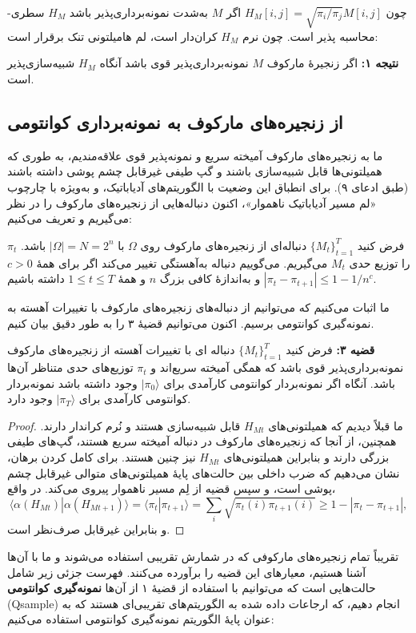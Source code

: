  چون $H_M[i,j] = \sqrt{\pi_i/\pi_j} M[i,j]$ اگر $M$ به‌شدت نمونه‌برداری‌پذیر باشد $H_M$ سطری-‌محاسبه پذیر است. چون نرم $H_M$  کران‌دار است، لم هامیلتونی تنک برقرار است: 
 
 \textbf{نتیجه ۱:}
  اگر زنجیرهٔ مارکوف $M$ نمونه‌برداری‌پذیر قوی باشد آنگاه $H_M$ شبیه‌سازی‌پذیر است.

\subsection{ از زنجیره‌های مارکوف به نمونه‌برداری کوانتومی}
ما به زنجیره‌های مارکوف آمیخته سریع و نمونه‌پذیر قوی علاقه‌مندیم، به طوری که همیلتونی‌ها قابل شبیه‌سازی باشند و گپ طیفی غیرقابل چشم پوشی داشته باشند (طبق ادعای ۹).  برای انطباق این وضعیت با الگوریتم‌های آدیاباتیک، و به‌ویژه با چارچوب «لم مسیر آدیاباتیک ناهموار»، اکنون دنباله‌هایی از زنجیره‌های مارکوف را در نظر می‌گیریم و تعریف می‌کنیم: 
\begin{defn}
	 فرض کنید $\{M_t\}_{t=1}^T$ دنباله‌ای از زنجیره‌های مارکوف روی $\Omega$ با $|\Omega| = N = 2^n$ باشد. $\pi_t$ را توزیع حدی $M_t$ می‌گیریم. می‌گوییم دنباله به‌آهستگی تغییر می‌کند اگر برای همهٔ $c > 0$ و به‌اندازهٔ کافی بزرگ $n$ و همهٔ $1 \le t \le T$ داشته باشیم $|\pi_t - \pi_{t+1}| \le 1 - 1/n^c$.
\end{defn}
ما اثبات می‌کنیم که می‌توانیم از دنباله‌های زنجیره‌های مارکوف با تغییرات آهسته به نمونه‌گیری کوانتومی برسیم. اکنون می‌توانیم قضیهٔ ۳ را به طور دقیق بیان کنیم.

\textbf{قضیه ۳:}
 فرض کنید $\{M_t\}_{t=1}^T$ دنباله ای با تغییرات آهسته از زنجیره‌های مارکوف نمونه‌برداری‌پذیر قوی باشد که همگی آمیخته سریع‌اند و $\pi_t$ توزیع‌های حدی متناظر آن‌ها باشد. آنگاه اگر نمونه‌بردار کوانتومی کارآمدی برای $|\pi_0\rangle$ وجود داشته باشد نمونه‌بردار کوانتومی کارآمدی برای $|\pi_T\rangle$ وجود دارد. 
\begin{proof}
ما قبلاً دیدیم که همیلتونی‌های $H_{Mt}$ قابل شبیه‌سازی هستند و نُرم کراندار دارند. همچنین، از آنجا که زنجیره‌های مارکوف در دنباله آمیخته سریع هستند، گپ‌های طیفی بزرگی دارند و بنابراین همیلتونی‌های $H_{Mt}$ نیز چنین هستند. برای کامل کردن برهان، نشان می‌دهیم که ضرب داخلی بین حالت‌های پایهٔ همیلتونی‌های متوالی غیرقابل چشم پوشی است، و سپس قضیه از لِم مسیر ناهموار پیروی می‌کند. در واقع،  
\[\langle \alpha ({H_{Mt}})|\alpha ({H_{Mt + 1}})\rangle  = \langle {\pi _t}|{\pi _{t + 1}}\rangle  = \sum\limits_i {\sqrt {{\pi _t}(i){\pi _{t + 1}}(i)} }  \geqslant 1 - |{\pi _t} - {\pi _{t + 1}}|,\]  
و بنابراین غیرقابل صرف‌نظر است.
\end{proof}
تقریباً تمام زنجیره‌های مارکوفی که در شمارش تقریبی استفاده می‌شوند و ما با آن‌ها آشنا هستیم، معیارهای این قضیه را برآورده می‌کنند. فهرست جزئی زیر شامل حالت‌هایی است که می‌توانیم با استفاده از قضیهٔ ۱ از آن‌ها \textbf{نمونه‌گیری کوانتومی} (Qsample) انجام دهیم، که ارجاعات داده شده به الگوریتم‌های تقریبی‌ای هستند که به عنوان پایهٔ الگوریتم نمونه‌گیری کوانتومی استفاده می‌کنیم:  

